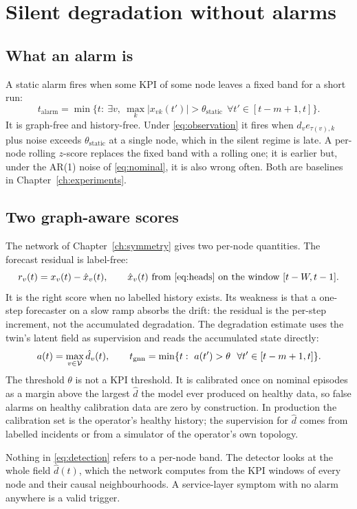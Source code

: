 \chapter{Silent degradation without alarms}
\label{ch:detection}

\section{What an alarm is}
A static alarm fires when some KPI of some node leaves a fixed band for a short run:
\begin{equation}
t_{\mathrm{alarm}}=\min\Big\{t:\ \exists v,\ \max_k|x_{vk}(t')|>\theta_{\mathrm{static}}\ \ \forall t'\in[t-m+1,t]\Big\}.
\label{eq:alarm}
\end{equation}
It is graph-free and history-free. Under \eqref{eq:observation} it fires when
$d_v e_{\tau(v),k}$ plus noise exceeds $\theta_{\mathrm{static}}$ at a single node, which in the silent
regime is late. A per-node rolling $z$-score replaces the fixed band with a rolling one; it is
earlier but, under the AR(1) noise of \eqref{eq:nominal}, it is also wrong often. Both are
baselines in Chapter~\ref{ch:experiments}.

\section{Two graph-aware scores}
The network of Chapter~\ref{ch:symmetry} gives two per-node quantities. The forecast residual is
label-free:
\begin{equation}
r_v(t)=x_v(t)-\hat x_v(t),\qquad \hat x_v(t)\ \text{from \eqref{eq:heads} on the window }[t-W,t-1].
\label{eq:residual}
\end{equation}
It is the right score when no labelled history exists. Its weakness is that a one-step forecaster
on a slow ramp absorbs the drift: the residual is the per-step increment, not the accumulated
degradation. The degradation estimate uses the twin's latent field as supervision and reads the
accumulated state directly:
\begin{equation}
a(t)=\max_{v\in\mathcal{V}}\hat d_v(t),\qquad
t_{\mathrm{gnn}}=\min\{t:\ a(t')>\theta\ \ \forall t'\in[t-m+1,t]\}.
\label{eq:detection}
\end{equation}
The threshold $\theta$ is not a KPI threshold. It is calibrated once on nominal episodes as a
margin above the largest $\hat d$ the model ever produced on healthy data, so false alarms on
healthy calibration data are zero by construction. In production the calibration set is the
operator's healthy history; the supervision for $\hat d$ comes from labelled incidents or from a
simulator of the operator's own topology.

\begin{remark}
Nothing in \eqref{eq:detection} refers to a per-node band. The detector looks at the whole field
$\hat d(t)$, which the network computes from the KPI windows of every node and their causal
neighbourhoods. A service-layer symptom with no alarm anywhere is a valid trigger.
\end{remark}
